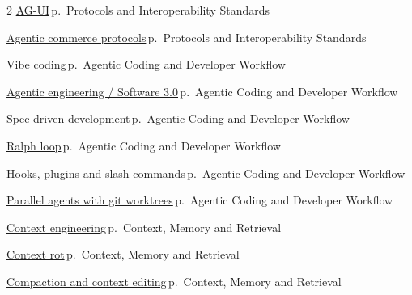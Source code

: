 \documentclass[10pt,a4paper,openany]{report}
\begin{document}
\begin{multicols}{2}
\hyperref[c:protocols-8]{AG-UI}\,{\color{muted}\scriptsize p.\,\pageref{c:protocols-8}} {\color{muted}\scriptsize Protocols and Interoperability Standards}\par\vspace{2pt}
\hyperref[c:protocols-9]{Agentic commerce protocols}\,{\color{muted}\scriptsize p.\,\pageref{c:protocols-9}} {\color{muted}\scriptsize Protocols and Interoperability Standards}\par\vspace{2pt}
\hyperref[c:coding-1]{Vibe coding}\,{\color{muted}\scriptsize p.\,\pageref{c:coding-1}} {\color{muted}\scriptsize Agentic Coding and Developer Workflow}\par\vspace{2pt}
\hyperref[c:coding-2]{Agentic engineering / Software 3.0}\,{\color{muted}\scriptsize p.\,\pageref{c:coding-2}} {\color{muted}\scriptsize Agentic Coding and Developer Workflow}\par\vspace{2pt}
\hyperref[c:coding-3]{Spec-driven development}\,{\color{muted}\scriptsize p.\,\pageref{c:coding-3}} {\color{muted}\scriptsize Agentic Coding and Developer Workflow}\par\vspace{2pt}
\hyperref[c:coding-4]{Ralph loop}\,{\color{muted}\scriptsize p.\,\pageref{c:coding-4}} {\color{muted}\scriptsize Agentic Coding and Developer Workflow}\par\vspace{2pt}
\hyperref[c:coding-5]{Hooks, plugins and slash commands}\,{\color{muted}\scriptsize p.\,\pageref{c:coding-5}} {\color{muted}\scriptsize Agentic Coding and Developer Workflow}\par\vspace{2pt}
\hyperref[c:coding-6]{Parallel agents with git worktrees}\,{\color{muted}\scriptsize p.\,\pageref{c:coding-6}} {\color{muted}\scriptsize Agentic Coding and Developer Workflow}\par\vspace{2pt}
\hyperref[c:context-0]{Context engineering}\,{\color{muted}\scriptsize p.\,\pageref{c:context-0}} {\color{muted}\scriptsize Context, Memory and Retrieval}\par\vspace{2pt}
\hyperref[c:context-1]{Context rot}\,{\color{muted}\scriptsize p.\,\pageref{c:context-1}} {\color{muted}\scriptsize Context, Memory and Retrieval}\par\vspace{2pt}
\hyperref[c:context-2]{Compaction and context editing}\,{\color{muted}\scriptsize p.\,\pageref{c:context-2}} {\color{muted}\scriptsize Context, Memory and Retrieval}\par\vspace{2pt}

\end{multicols}
\end{document}
